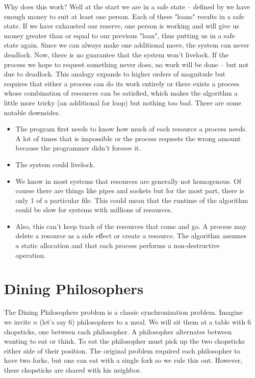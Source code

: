 Why does this work? Well at the start we are in a safe state -- defined by we have enough money to suit at least one person.
Each of these "loans" results in a safe state.
If we have exhausted our reserve, one person is working and will give us money greater than or equal to our previous "loan", thus putting us in a safe state again.
Since we can always make one additional move, the system can never deadlock.
Now, there is no guarantee that the system won't livelock.
If the process we hope to request something never does, no work will be done -- but not due to deadlock.
This analogy expands to higher orders of magnitude but requires that either a process can do its work entirely or there exists a process whose combination of resources can be satisfied, which makes the algorithm a little more tricky (an additional for loop) but nothing too bad.
There are some notable downsides.

\begin{itemize}
\item The program first needs to know how much of each resource a process needs. A lot of times that is impossible or the process requests the wrong amount because the programmer didn't foresee it.
\item The system could livelock.
\item We know in most systems that resources are generally not homogenous. Of course there are things like pipes and sockets but for the most part, there is only 1 of a particular file. This could mean that the runtime of the algorithm could be slow for systems with millions of resources.
\item Also, this can't keep track of the resources that come and go. A process may delete a resource as a side effect or create a resource. The algorithm assumes a static allocation and that each process performs a non-destructive operation.
\end{itemize}

\section{Dining Philosophers}

The Dining Philosophers problem is a classic synchronization problem.
Imagine we invite $n$ (let's say 6) philosophers to a meal.
We will sit them at a table with 6 chopsticks, one between each philosopher.
A philosopher alternates between wanting to eat or think.
To eat the philosopher must pick up the two chopsticks either side of their position.
The original problem required each philosopher to have two forks, but one can eat with a single fork so we rule this out.
However, these chopsticks are shared with his neighbor.


